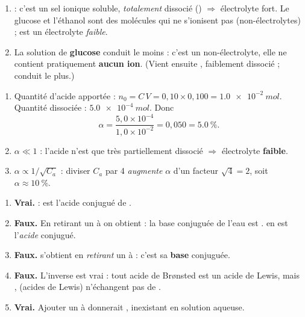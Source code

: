 \documentclass[11pt,a4paper]{article}
\begin{document}
\begin{corrige}
\begin{enumerate}[label=\alph*)]
  \item \textbf{} : c'est un sel ionique soluble, \emph{totalement} dissocié
        () $\Rightarrow$ électrolyte fort. Le glucose et l'éthanol sont des molécules qui ne
        s'ionisent pas (non-électrolytes) ;  est un électrolyte \emph{faible}.
  \item La solution de \textbf{glucose} conduit le moins : c'est un non-électrolyte, elle ne contient
        pratiquement \textbf{aucun ion}. (Vient ensuite , faiblement dissocié ;  conduit le plus.)
\end{enumerate}
\end{corrige}

\begin{corrige}
\begin{enumerate}[label=\alph*)]
  \item Quantité d'acide apportée : $n_0 = C\,V = 0,10 \times 0,100 = \qty{1,0e-2}{mol}$. Quantité dissociée :
        $\qty{5,0e-4}{mol}$. Donc
        \[ \alpha = \frac{5,0\times10^{-4}}{1,0\times10^{-2}} = 0,050 = \qty{5,0}{\percent}. \]
  \item $\alpha \ll 1$ : l'acide n'est que très partiellement dissocié $\Rightarrow$ électrolyte \textbf{faible}.
  \item $\alpha \propto 1/\sqrt{C_a}$ : diviser $C_a$ par \num{4} \emph{augmente} $\alpha$ d'un facteur
        $\sqrt{4} = 2$, soit $\alpha \approx \qty{10}{\percent}$.
\end{enumerate}
\end{corrige}

\begin{corrige}
\begin{enumerate}[label=\alph*)]
  \item \textbf{Vrai.}  :  est l'acide conjugué de .
  \item \textbf{Faux.} En retirant un  à  on obtient  : la base conjuguée de l'eau est
        .  en est l'\emph{acide} conjugué.
  \item \textbf{Faux.}  s'obtient en \emph{retirant} un  à  : c'est sa
        \textbf{base} conjuguée.
  \item \textbf{Faux.} L'inverse est vrai : tout acide de Brønsted est un acide de Lewis, mais ,
         (acides de Lewis) n'échangent pas de .
  \item \textbf{Vrai.} Ajouter un  à  donnerait , inexistant en solution aqueuse.
\end{enumerate}
\end{corrige}
\end{document}
